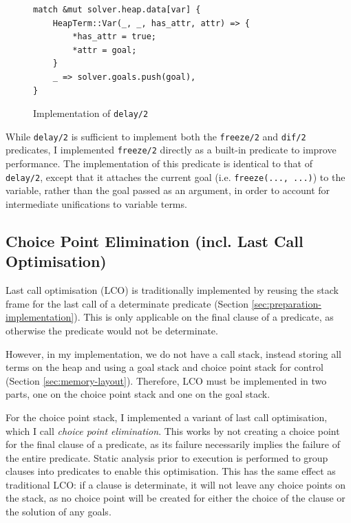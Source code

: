\begin{figure}[H]
\centering
\begin{verbatim}
match &mut solver.heap.data[var] {
    HeapTerm::Var(_, _, has_attr, attr) => {
        *has_attr = true;
        *attr = goal;
    }
    _ => solver.goals.push(goal),
}
\end{verbatim}
\caption{Implementation of \texttt{delay/2}}
\label{fig:delay-impl}
\end{figure}

While \texttt{delay/2} is sufficient to implement both the \texttt{freeze/2} and \texttt{dif/2} predicates, I implemented \texttt{freeze/2} directly as a built-in predicate to improve performance. The implementation of this predicate is identical to that of \texttt{delay/2}, except that it attaches the current goal (i.e. \texttt{freeze(..., ...)}) to the variable, rather than the goal passed as an argument, in order to account for intermediate unifications to variable terms.

\subsection{Choice Point Elimination (incl. Last Call Optimisation)}

\label{sec:choice-point-elimination}

Last call optimisation (LCO) is traditionally implemented by reusing the stack frame for the last call of a determinate predicate (Section \ref{sec:preparation-implementation}). This is only applicable on the final clause of a predicate, as otherwise the predicate would not be determinate.

However, in my implementation, we do not have a call stack, instead storing all terms on the heap and using a goal stack and choice point stack for control (Section \ref{sec:memory-layout}). Therefore, LCO must be implemented in two parts, one on the choice point stack and one on the goal stack.

For the choice point stack, I implemented a variant of last call optimisation, which I call \emph{choice point elimination}. This works by not creating a choice point for the final clause of a predicate, as its failure necessarily implies the failure of the entire predicate. Static analysis prior to execution is performed to group clauses into predicates to enable this optimisation. This has the same effect as traditional LCO: if a clause is determinate, it will not leave any choice points on the stack, as no choice point will be created for either the choice of the clause or the solution of any goals.

